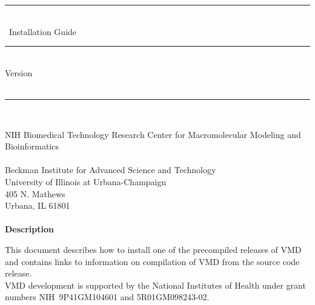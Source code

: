 \documentclass[11pt]{article}
\newcommand{\DOCTITLE} {Installation Guide}
\newcommand{\DOCDESC} {
This document describes how to install one of the precompiled releases
of VMD and contains links to information on compilation of VMD from the
source code release.}
\begin{document}
\thispagestyle{empty}

\vspace*{0.3in}

\begin{center}
  \rule{6in}{0.04in}                            \\      \vspace{0.25in}
  {\Huge \VMD\ \DOCTITLE}                       \\      \vspace{0.25in}
  \rule{6in}{0.04in}                            \\      \vspace{0.25in}
  {\Large Version \VMDVER}                      \\      \vspace{0.20in}
  \VMDDATE                                      \\      \vspace{0.20in}
  \rule{6in}{0.04in}                            \\      \vspace{0.25in}


  {\Large NIH Biomedical Technology Research Center for Macromolecular Modeling and Bioinformatics}  \\      \vspace{0.20in}
  {\large       {}  \\
                Beckman Institute for Advanced Science and Technology \\
                University of Illinois at Urbana-Champaign            \\
                405 N. Mathews                                        \\
                Urbana, IL  61801                                     \\
                \vspace{0.1in}  \\
  }
  \vspace{0.5in}
  {\Large \bf Description}
  \vspace{0.1in}
\end{center}

{\DOCDESC}
\vspace{0.1in} \\
VMD development is supported by the National Institutes of Health
under grant numbers NIH~9P41GM104601 and 5R01GM098243-02.
\end{document}
